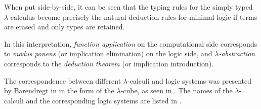 When put side-by-side, it can be seen that the typing rules for the simply typed
$\lambda$-calculus become precisely the natural-deduction rules for minimal logic
if terms are erased and only types are retained.

In this interpretation, \emph{function application} on the computational side corresponds
to \emph{modus ponens} (or implication elimination) on the logic side, and
\emph{$\lambda$-abstraction} corresponds to the \emph{deduction theorem} (or implication
introduction).

The correspondence between different $\lambda$-calculi and logic systems was presented
by Barendregt in \cite{barendregt91} in the form of the $\lambda$-cube, as seen in
. The names of the $\lambda$-calculi and the corresponding
logic systems are listed in .

